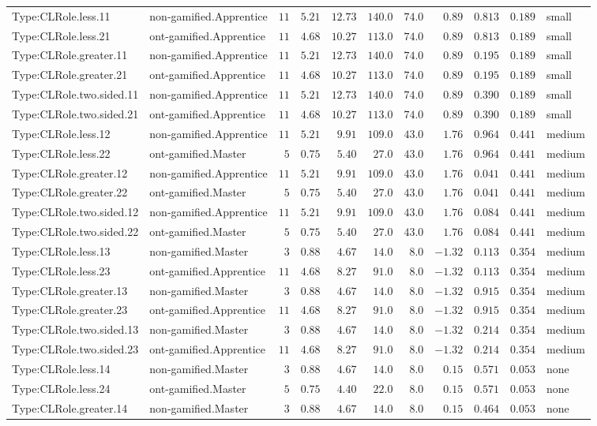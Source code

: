 \documentclass[6pt,a4paper]{article}
\begin{document}
{\begin{longtable}{llrrrrrrrrl}
Type:CLRole.less.11&non-gamified.Apprentice&$11$&$5.21$&$12.73$&$140.0$&$ 74.0$&$ 0.89$&$0.813$&$0.189$&small\tabularnewline
Type:CLRole.less.21&ont-gamified.Apprentice&$11$&$4.68$&$10.27$&$113.0$&$ 74.0$&$ 0.89$&$0.813$&$0.189$&small\tabularnewline
Type:CLRole.greater.11&non-gamified.Apprentice&$11$&$5.21$&$12.73$&$140.0$&$ 74.0$&$ 0.89$&$0.195$&$0.189$&small\tabularnewline
Type:CLRole.greater.21&ont-gamified.Apprentice&$11$&$4.68$&$10.27$&$113.0$&$ 74.0$&$ 0.89$&$0.195$&$0.189$&small\tabularnewline
Type:CLRole.two.sided.11&non-gamified.Apprentice&$11$&$5.21$&$12.73$&$140.0$&$ 74.0$&$ 0.89$&$0.390$&$0.189$&small\tabularnewline
Type:CLRole.two.sided.21&ont-gamified.Apprentice&$11$&$4.68$&$10.27$&$113.0$&$ 74.0$&$ 0.89$&$0.390$&$0.189$&small\tabularnewline
Type:CLRole.less.12&non-gamified.Apprentice&$11$&$5.21$&$ 9.91$&$109.0$&$ 43.0$&$ 1.76$&$0.964$&$0.441$&medium\tabularnewline
Type:CLRole.less.22&ont-gamified.Master&$ 5$&$0.75$&$ 5.40$&$ 27.0$&$ 43.0$&$ 1.76$&$0.964$&$0.441$&medium\tabularnewline
Type:CLRole.greater.12&non-gamified.Apprentice&$11$&$5.21$&$ 9.91$&$109.0$&$ 43.0$&$ 1.76$&$0.041$&$0.441$&medium\tabularnewline
Type:CLRole.greater.22&ont-gamified.Master&$ 5$&$0.75$&$ 5.40$&$ 27.0$&$ 43.0$&$ 1.76$&$0.041$&$0.441$&medium\tabularnewline
Type:CLRole.two.sided.12&non-gamified.Apprentice&$11$&$5.21$&$ 9.91$&$109.0$&$ 43.0$&$ 1.76$&$0.084$&$0.441$&medium\tabularnewline
Type:CLRole.two.sided.22&ont-gamified.Master&$ 5$&$0.75$&$ 5.40$&$ 27.0$&$ 43.0$&$ 1.76$&$0.084$&$0.441$&medium\tabularnewline
Type:CLRole.less.13&non-gamified.Master&$ 3$&$0.88$&$ 4.67$&$ 14.0$&$  8.0$&$-1.32$&$0.113$&$0.354$&medium\tabularnewline
Type:CLRole.less.23&ont-gamified.Apprentice&$11$&$4.68$&$ 8.27$&$ 91.0$&$  8.0$&$-1.32$&$0.113$&$0.354$&medium\tabularnewline
Type:CLRole.greater.13&non-gamified.Master&$ 3$&$0.88$&$ 4.67$&$ 14.0$&$  8.0$&$-1.32$&$0.915$&$0.354$&medium\tabularnewline
Type:CLRole.greater.23&ont-gamified.Apprentice&$11$&$4.68$&$ 8.27$&$ 91.0$&$  8.0$&$-1.32$&$0.915$&$0.354$&medium\tabularnewline
Type:CLRole.two.sided.13&non-gamified.Master&$ 3$&$0.88$&$ 4.67$&$ 14.0$&$  8.0$&$-1.32$&$0.214$&$0.354$&medium\tabularnewline
Type:CLRole.two.sided.23&ont-gamified.Apprentice&$11$&$4.68$&$ 8.27$&$ 91.0$&$  8.0$&$-1.32$&$0.214$&$0.354$&medium\tabularnewline
Type:CLRole.less.14&non-gamified.Master&$ 3$&$0.88$&$ 4.67$&$ 14.0$&$  8.0$&$ 0.15$&$0.571$&$0.053$&none\tabularnewline
Type:CLRole.less.24&ont-gamified.Master&$ 5$&$0.75$&$ 4.40$&$ 22.0$&$  8.0$&$ 0.15$&$0.571$&$0.053$&none\tabularnewline
Type:CLRole.greater.14&non-gamified.Master&$ 3$&$0.88$&$ 4.67$&$ 14.0$&$  8.0$&$ 0.15$&$0.464$&$0.053$&none\tabularnewline

\end{longtable}}
\end{document}
